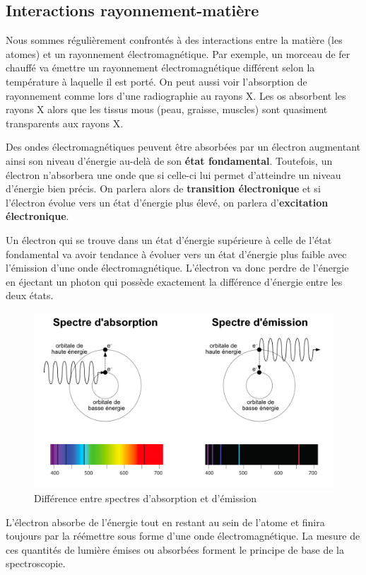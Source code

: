 \documentclass[
  11pt,
  a4paper,
  openany]{book}
\begin{document}
\hypertarget{interactions-rayonnement-matiuxe8re-1}{%
\subsection{Interactions rayonnement-matière}\label{interactions-rayonnement-matiuxe8re-1}}

Nous sommes régulièrement confrontés à des interactions entre la matière (les atomes) et un rayonnement électromagnétique. Par exemple, un morceau de fer chauffé va émettre un rayonnement électromagnétique différent selon la température à laquelle il est porté. On peut aussi voir l'absorption de rayonnement comme lors d'une radiographie au rayons X. Les os absorbent les rayons X alors que les tissus mous (peau, graisse, muscles) sont quasiment transparents aux rayons X.

Des ondes électromagnétiques peuvent être absorbées par un électron augmentant ainsi son niveau d'énergie au-delà de son \textbf{état fondamental}. Toutefois, un électron n'absorbera une onde que si celle-ci lui permet d'atteindre un niveau d'énergie bien précis. On parlera alors de \textbf{transition électronique} et si l'électron évolue vers un état d'énergie plus élevé, on parlera d'\textbf{excitation électronique}.

Un électron qui se trouve dans un état d'énergie supérieure à celle de l'état fondamental va avoir tendance à évoluer vers un état d'énergie plus faible avec l'émission d'une onde électromagnétique. L'électron va donc perdre de l'énergie en éjectant un photon qui possède exactement la différence d'énergie entre les deux états.

\begin{figure}

{\centering \includegraphics[width=0.5\linewidth]{images/absorption-emission} 

}

\caption{Différence entre spectres d'absorption et d'émission}\label{fig:absorption-emission}
\end{figure}

L'électron absorbe de l'énergie tout en restant au sein de l'atome et finira
toujours par la réémettre sous forme d'une onde électromagnétique. La mesure de ces quantités de lumière émises ou absorbées forment le principe de base de la spectroscopie.
\end{document}

